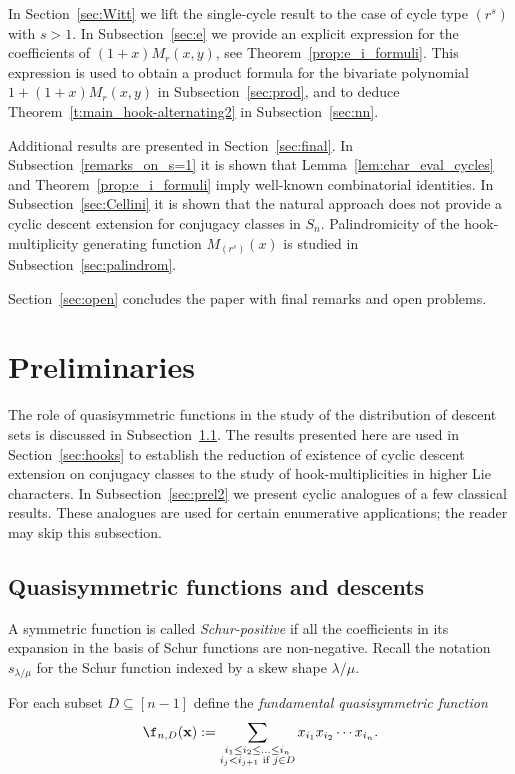 In Section~\ref{sec:Witt} we lift the single-cycle result to the case of cycle type $(r^s)$ with $s>1$. 
In Subsection~\ref{sec:e} we provide an explicit expression for the coefficients of $(1+x)M_r(x,y)$, see Theorem~\ref{prop:e_i_formuli}.
This expression is used to obtain a product formula 
for the bivariate polynomial $1+(1+x)M_r(x,y)$
in Subsection~\ref{sec:prod}, 
and to deduce Theorem~\ref{t:main_hook-alternating2} in Subsection~\ref{sec:nn}. 

Additional results are presented in Section~\ref{sec:final}. 
In Subsection~\ref{remarks_on_s=1} it is shown that 
Lemma~\ref{lem:char_eval_cycles} and Theorem~\ref{prop:e_i_formuli} 
imply well-known combinatorial identities. 
In Subsection~\ref{sec:Cellini} it is shown that the natural approach does not provide a cyclic descent extension for conjugacy classes in $S_n$.
Palindromicity of the hook-multiplicity generating function $M_{(r^s)}(x)$ is studied in Subsection~\ref{sec:palindrom}. 

Section~\ref{sec:open} concludes the paper with final remarks and open problems.


\section{Preliminaries}\label{sec:background}
	

The role of quasisymmetric functions in the study of the distribution of descent 
sets is discussed in Subsection~\ref{sec:prel1}. 
The results presented here are 	used in Section~\ref{sec:hooks} 
to establish 
the reduction of existence of cyclic descent extension on conjugacy classes to the study of hook-multiplicities in higher Lie characters.
In Subsection~\ref{sec:prel2} we  
present cyclic analogues of a few classical results. These analogues are used for  
certain enumerative applications; the reader may skip this subsection.
	

\subsection{Quasisymmetric functions and descents}\label{sec:prel1} 

A symmetric function is called {\em Schur-positive} if all the
coefficients in its expansion in the basis of Schur functions are non-negative. Recall the notation 
$s_{\lambda/\mu}$ for the Schur function indexed by a skew shape $\lambda/\mu$. 
	
\begin{defn}\label{def:fundamental_QSF}
	For each subset $D \subseteq [n-1]$ define the {\em
		fundamental quasisymmetric function}
	\[
	   \f_{n,D}({\bf x}) := \sum_{\substack{i_1\le i_2 \le \ldots \le i_n \\ {i_j < i_{j+1} \text{ if } j \in D}}} 
	   x_{i_1} x_{i_2} \cdots x_{i_n}.
	\]
\end{defn}
 		

